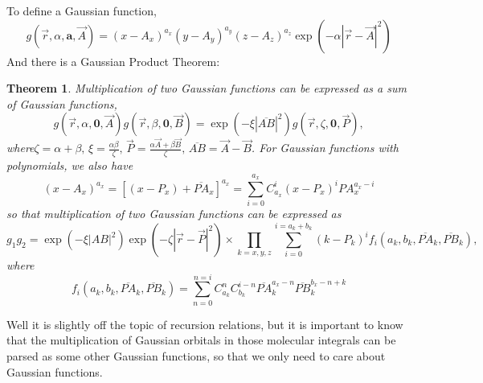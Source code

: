 \documentclass[12pt,a4paper,openany,twoside]{article}
\newtheorem{theorem}{Theorem}[section]
\numberwithin{equation}{section}
\begin{document}
To define a Gaussian function,
\begin{equation}
    g(\vec{r},\alpha,\boldsymbol{a},\vec{A}) = (x- A_x)^{a_x} (y-A_y)^{a_y} (z-A_z)^{a_z} \exp \left(-\alpha |\vec{r} - \vec{A}|^2\right)
\end{equation}
And there is a Gaussian Product Theorem:
\begin{theorem}
    Multiplication of two Gaussian functions can be expressed as a sum of Gaussian functions,
    \begin{equation}
        g(\vec{r},\alpha, \boldsymbol{0},\vec{A})g(\vec{r},\beta, \boldsymbol{0},\vec{B}) = \exp(-\xi |\overline{AB}|^2) g(\vec{r},\zeta,\boldsymbol{0},\vec{P}),
    \end{equation}
    where$\zeta = \alpha + \beta, \, \xi = \frac{\alpha\beta}{\zeta}, \, \vec{P} = \frac{\alpha \vec{A} + \beta \vec{B}}{\zeta}, \, \overline{AB} = \vec{A} - \vec{B}$.
    For Gaussian functions with polynomials, we also have
    \begin{equation}
        (x- A_x) ^{a_x} = [(x-P_x) + \overline{PA}_x]^{a_x} = \sum_{i=0}^{a_x} C_{a_x}^i (x-P_x)^i {PA}_x^{a_x - i}
    \end{equation}
    so that multiplication of two Gaussian functions can be expressed as 
    \begin{equation}
        g_1g_2 = \exp(-\xi|AB|^2) \exp(-\zeta|\vec{r} - \vec{P}|^2) \times \prod_{k=x,y,z} \sum_{i=0}^{i=a_k+b_k}(k-P_k)^i f_i (a_k,b_k,\overline{PA}_k,\overline{PB}_k),
    \end{equation}
    where
    \begin{equation}
        f_i(a_k,b_k,\overline{PA}_k,\overline{PB}_k) = \sum_{n=0}^{n=i} C_{a_k}^{n} C_{b_k}^{i-n} \overline{PA}_k^{a_x-n}\overline{PB}_k^{b_x-n+k}
    \end{equation}
\end{theorem}
Well it is slightly off the topic of recursion relations, but it is important to know that the multiplication of Gaussian orbitals in those molecular integrals can be parsed as some other Gaussian functions, so that we only need to care about Gaussian functions.
\end{document}
